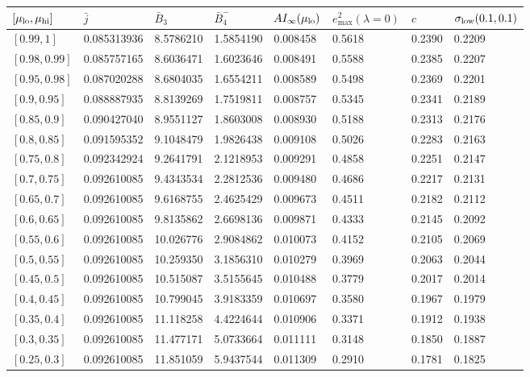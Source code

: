 \begin{table}[htbp]
\centering\footnotesize
\setlength{\tabcolsep}{4pt}
\begin{tabular}{l|lll|l|lll}
$[\mu_{\rm lo},\mu_{\rm hi}]$ & $\bar j$ & $\bar B_3$ & $\bar B_4^-$ & $AI_\infty(\mu_{\rm lo})$ & $e^2_{\max}(\lambda=0)$ & $c$ & $\sigma_{\rm low}(0.1,0.1)$\\\hline
$[0.99,1]$ & 0.085313936 & 8.5786210 & 1.5854190 & 0.008458 & 0.5618 & 0.2390 & 0.2209\\
$[0.98,0.99]$ & 0.085757165 & 8.6036471 & 1.6023646 & 0.008491 & 0.5588 & 0.2385 & 0.2207\\
$[0.95,0.98]$ & 0.087020288 & 8.6804035 & 1.6554211 & 0.008589 & 0.5498 & 0.2369 & 0.2201\\
$[0.9,0.95]$ & 0.088887935 & 8.8139269 & 1.7519811 & 0.008757 & 0.5345 & 0.2341 & 0.2189\\
$[0.85,0.9]$ & 0.090427040 & 8.9551127 & 1.8603008 & 0.008930 & 0.5188 & 0.2313 & 0.2176\\
$[0.8,0.85]$ & 0.091595352 & 9.1048479 & 1.9826438 & 0.009108 & 0.5026 & 0.2283 & 0.2163\\
$[0.75,0.8]$ & 0.092342924 & 9.2641791 & 2.1218953 & 0.009291 & 0.4858 & 0.2251 & 0.2147\\
$[0.7,0.75]$ & 0.092610085 & 9.4343534 & 2.2812536 & 0.009480 & 0.4686 & 0.2217 & 0.2131\\
$[0.65,0.7]$ & 0.092610085 & 9.6168755 & 2.4625429 & 0.009673 & 0.4511 & 0.2182 & 0.2112\\
$[0.6,0.65]$ & 0.092610085 & 9.8135862 & 2.6698136 & 0.009871 & 0.4333 & 0.2145 & 0.2092\\
$[0.55,0.6]$ & 0.092610085 & 10.026776 & 2.9084862 & 0.010073 & 0.4152 & 0.2105 & 0.2069\\
$[0.5,0.55]$ & 0.092610085 & 10.259350 & 3.1856310 & 0.010279 & 0.3969 & 0.2063 & 0.2044\\
$[0.45,0.5]$ & 0.092610085 & 10.515087 & 3.5155645 & 0.010488 & 0.3779 & 0.2017 & 0.2014\\
$[0.4,0.45]$ & 0.092610085 & 10.799045 & 3.9183359 & 0.010697 & 0.3580 & 0.1967 & 0.1979\\
$[0.35,0.4]$ & 0.092610085 & 11.118258 & 4.4224644 & 0.010906 & 0.3371 & 0.1912 & 0.1938\\
$[0.3,0.35]$ & 0.092610085 & 11.477171 & 5.0733664 & 0.011111 & 0.3148 & 0.1850 & 0.1887\\
$[0.25,0.3]$ & 0.092610085 & 11.851059 & 5.9437544 & 0.011309 & 0.2910 & 0.1781 & 0.1825\\

\end{tabular}
\end{table}
